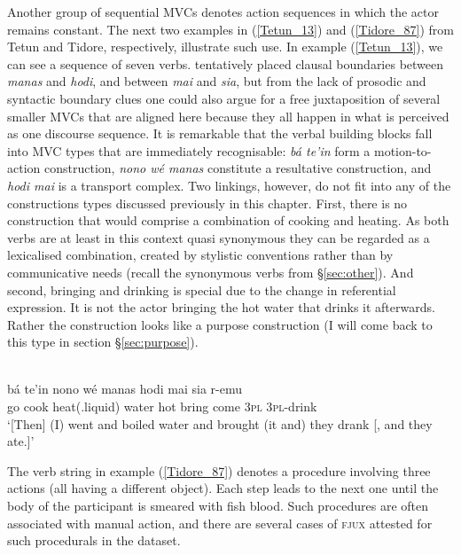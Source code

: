 Another group of sequential MVCs denotes action sequences in which the actor remains constant. The next two examples in (\ref{Tetun_13}) and (\ref{Tidore_87}) from Tetun and Tidore, respectively, illustrate such use. In example (\ref{Tetun_13}), we can see a sequence of seven verbs. \citet{vanklinken1999grammar} tentatively placed clausal boundaries between \textit{manas} and \textit{hodi}, and between \textit{mai} and \textit{sia}, but from the lack of prosodic and syntactic boundary clues one could also argue for a free juxtaposition of several smaller MVCs that are aligned here because they all happen in what is perceived as one discourse sequence. It is remarkable that the verbal building blocks fall into MVC types that are immediately recognisable: \textit{bá te'in} form a motion-to-action construction, \textit{nono wé manas} constitute a resultative construction, and \textit{hodi mai} is a transport complex. Two linkings, however, do not fit into any of the constructions types discussed previously in this chapter. First, there is no construction that would comprise a combination of cooking and heating. As both verbs are at least in this context quasi synonymous they can be regarded as a lexicalised combination, created by stylistic conventions rather than by communicative needs (recall the synonymous verbs from §\ref{sec:other}). And second, bringing and drinking is special due to the change in referential expression. It is not the actor bringing the hot water that drinks it afterwards. Rather the construction looks like a purpose construction (I will come back to this type in section §\ref{sec:purpose}). 

\ea \label{Tetun_13}
\\
\gll bá te'in nono wé manas hodi mai sia r-emu \\
go cook heat(.liquid) water hot bring come 3\textsc{pl} 3\textsc{pl}-drink \\
\glft `[Then] (I) went and boiled water and brought (it and) they drank [, and they ate.]'\\ 
\z

The verb string in example (\ref{Tidore_87}) denotes a procedure involving three actions (all having a different object). Each step leads to the next one until the body of the participant is smeared with fish blood. Such procedures are often associated with manual action, and there are several cases of \textsc{fjux} attested for such procedurals in the dataset.

